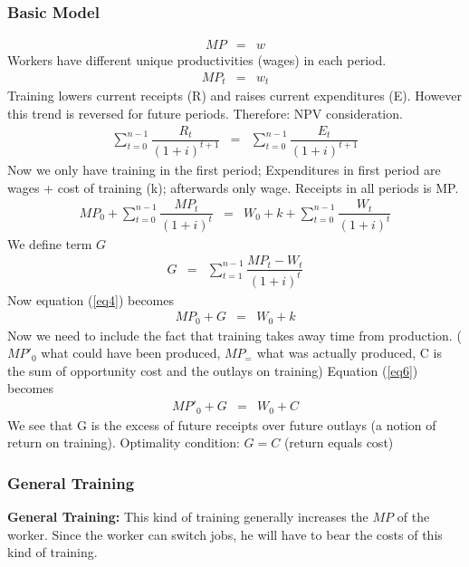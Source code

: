 \documentclass[12pt,a4paper]{article}
\begin{document}
  \subsubsection{Basic Model} %
  \label{sec:model}
  \begin{eqnarray}
    MP &=& w
  \end{eqnarray}
  Workers have different unique productivities (wages) in each period.
  \begin{eqnarray}
    MP_{t}&=&w_{t}
  \end{eqnarray}
  Training lowers current receipts (R) and raises current expenditures
  (E). However this trend is reversed for future periods. Therefore: NPV
  consideration.
  \begin{eqnarray}
    \sum_{t=0}^{n-1} \dfrac{R_t}{(1+i)^{t+1}} &=& \sum_{t=0}^{n-1}
    \dfrac{E_t}{(1+i)^{t+1}}
  \end{eqnarray}
  Now we only have training in the first period; Expenditures in first
  period are wages + cost of training (k); afterwards only wage. Receipts
  in all periods is MP.
  \begin{eqnarray}
    MP_0 + \sum_{t=0}^{n-1} \dfrac{MP_t}{(1+i)^{t}} &=& W_0 + k +
    \sum_{t=0}^{n-1} \dfrac{W_t}{(1+i)^{t}} \label{eq4}
  \end{eqnarray}
  We define term $G$
  \begin{eqnarray}
    G&=& \sum_{t=1}^{n-1} \dfrac{MP_t - W_t}{(1+i)^{t}}
  \end{eqnarray}
  Now equation (\ref{eq4}) becomes
  \begin{eqnarray}
    MP_0 + G &=& W_0 + k \label{eq6}
  \end{eqnarray}
  Now we need to include the fact that training takes away time from
  production. ($MP'_0$ what could have been produced, $MP_=$ what was
  actually produced, C is the sum of opportunity cost and the outlays on
  training) Equation (\ref{eq6}) becomes
  \begin{eqnarray}
    MP'_0 + G &=& W_0 + C \label{eq7}
  \end{eqnarray}
  We see that G is the excess of future receipts over future outlays (a
  notion of return on training). Optimality condition: $G=C$ (return
  equals cost)

  \subsubsection{General Training} %
  \label{sub:general_training}
  \textbf{General Training:} This kind of training generally increases
  the $MP$ of the worker. Since the worker can switch jobs, he will
  have to bear the costs of this kind of training.
\end{document}
